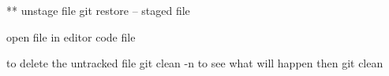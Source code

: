 ** unstage file 
git restore -- staged file 


open file in editor
  code file 

to delete the untracked file 
git clean -n  to see what will happen 
then 
git clean 